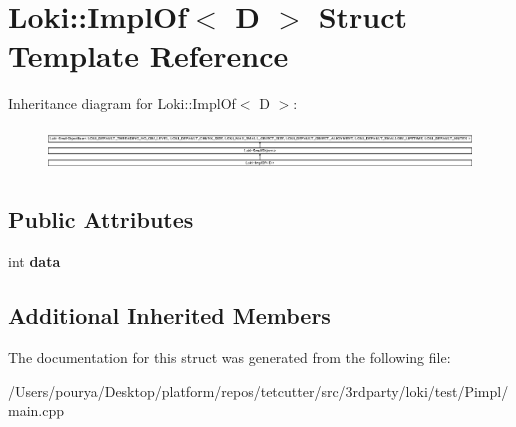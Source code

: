 \hypertarget{structLoki_1_1ImplOf_3_01D_01_4}{}\section{Loki\+:\+:Impl\+Of$<$ D $>$ Struct Template Reference}
\label{structLoki_1_1ImplOf_3_01D_01_4}
Inheritance diagram for Loki\+:\+:Impl\+Of$<$ D $>$\+:\begin{figure}[H]
\begin{center}
\leavevmode
\includegraphics[height=1.150685cm]{structLoki_1_1ImplOf_3_01D_01_4}
\end{center}
\end{figure}
\subsection*{Public Attributes}
\begin{DoxyCompactItemize}
\item 
\hypertarget{structLoki_1_1ImplOf_3_01D_01_4_aab4c54b52b490a85be6a490860dfd948}{}int {\bfseries data}\label{structLoki_1_1ImplOf_3_01D_01_4_aab4c54b52b490a85be6a490860dfd948}

\end{DoxyCompactItemize}
\subsection*{Additional Inherited Members}


The documentation for this struct was generated from the following file\+:\begin{DoxyCompactItemize}
\item 
/\+Users/pourya/\+Desktop/platform/repos/tetcutter/src/3rdparty/loki/test/\+Pimpl/main.\+cpp\end{DoxyCompactItemize}
